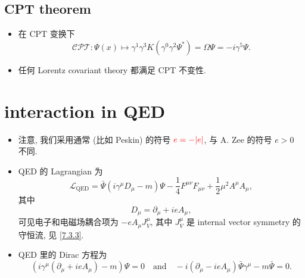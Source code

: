\subsection{CPT theorem}
\begin{itemize}
	\item 在 CPT 变换下
	\begin{equation}
		\mathcal{CPT} : \Psi(x) \mapsto \gamma^1 \gamma^3 K (\gamma^0 \gamma^2 \Psi^*) = \Omega \Psi = - i \gamma^5 \Psi.
	\end{equation}
	
	\item 任何 Lorentz covariant theory 都满足 CPT 不变性.
\end{itemize}

\section{interaction in QED}
\begin{itemize}
	\item 注意, 我们采用通常 (比如 Peskin) 的符号 $\mathcolor{red}{e = - |e|}$, 与 A. Zee 的符号 $e > 0$ 不同.
	
	\item QED 的 Lagrangian 为
	\begin{equation} \label{7.6.1}
		\mathcal{L}_\text{QED} = \bar{\Psi} (i \gamma^\mu D_\mu - m) \Psi - \frac{1}{4} F^{\mu \nu} F_{\mu \nu} + \frac{1}{2} \mu^2 A^\mu A_\mu,
	\end{equation}
	其中
	\begin{equation}
		D_\mu = \partial_\mu + i e A_\mu,
	\end{equation}
	可见电子和电磁场耦合项为 $- e A_\mu J_V^\mu$, 其中 $J_V^\mu$ 是 internal vector symmetry 的守恒流, 见 \eqref{7.3.3}.
	
	\item QED 里的 Dirac 方程为
	\begin{equation}
		(i \gamma^\mu (\partial_\mu + i e A_\mu) - m) \Psi = 0 \quad \text{and} \quad - i (\partial_\mu - i e A_\mu) \bar{\Psi} \gamma^\mu - m \bar{\Psi} = 0.
	\end{equation}
\end{itemize}


